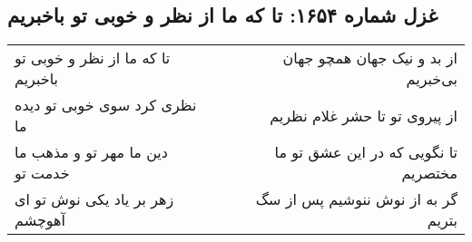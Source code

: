\begin{center}
\section*{غزل شماره ۱۶۵۴: تا که ما از نظر و خوبی تو باخبریم}
\label{sec:1654}
\begin{longtable}{l p{0.5cm} r}
تا که ما از نظر و خوبی تو باخبریم
&&
از بد و نیک جهان همچو جهان بی‌خبریم
\\
نظری کرد سوی خوبی تو دیده ما
&&
از پیروی تو تا حشر غلام نظریم
\\
دین ما مهر تو و مذهب ما خدمت تو
&&
تا نگویی که در این عشق تو ما مختصریم
\\
زهر بر یاد یکی نوش تو ای آهوچشم
&&
گر به از نوش ننوشیم پس از سگ بتریم
\\
\end{longtable}
\end{center}
